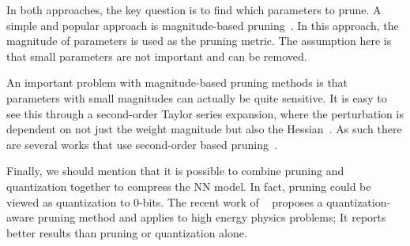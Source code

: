 In both approaches, the key question is to find which parameters to prune.
A simple and popular approach is magnitude-based pruning~\cite{chauvin1989back,hanson1988comparing,mozer1988skeletonization,li2016pruning,he2017channel,liu2017learning,he2019filter,lin2020hrank}.
In this approach, the magnitude of parameters is used as the pruning metric.
The assumption here is that small parameters are not important and can be removed.

An important problem with magnitude-based pruning methods is that parameters with small magnitudes can actually be quite sensitive.
It is easy to see this through a second-order Taylor series expansion, where the perturbation is dependent on not just the weight magnitude but
also the Hessian~\cite{lecun1990optimal}. As such there are several works that use
second-order based pruning~\cite{lecun1990optimal,hassibi1993optimal,hassibi1993second,wang2019eigendamage,yu2021hessian}.

Finally, we should mention that it is possible to 
combine pruning and quantization together to compress the NN model.
In fact, pruning could be viewed as quantization to 0-bits. The recent work
of ~\cite{hawks2021ps} proposes a quantization-aware pruning
method and applies to high energy physics problems;  It reports
better results than pruning or quantization alone.


